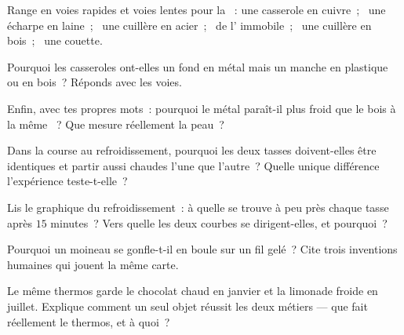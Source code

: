 \begin{exercise}[$\star$]\label{exo:g5:heat-and-insulation:3}
Range en voies rapides et voies lentes pour la ~: une
casserole en cuivre~; \ une écharpe en laine~; \ une cuillère en
acier~; \ de l' immobile~; \ une cuillère en bois~; \ une couette.
\end{exercise}

\begin{exercise}[$\star$]\label{exo:g5:heat-and-insulation:4}
Pourquoi les casseroles ont-elles un fond en métal mais un manche en
plastique ou en bois~? Réponds avec les voies.
\end{exercise}

\begin{exercise}[$\star$]\label{exo:g5:heat-and-insulation:5}
Enfin, avec tes propres mots~: pourquoi le métal paraît-il plus froid
que le bois à la même ~? Que mesure réellement la peau~?
\end{exercise}

\begin{exercise}[$\star$]\label{exo:g5:heat-and-insulation:6}
Dans la course au refroidissement, pourquoi les deux tasses
doivent-elles être identiques et partir aussi chaudes l'une que
l'autre~? Quelle unique différence l'expérience teste-t-elle~?
\end{exercise}

\begin{exercise}[$\star$]\label{exo:g5:heat-and-insulation:7}
Lis le graphique du refroidissement~: à quelle  se trouve
à peu près chaque tasse après $15$ minutes~? Vers quelle 
les deux courbes se dirigent-elles, et pourquoi~?
\end{exercise}

\begin{exercise}[$\star$]\label{exo:g5:heat-and-insulation:8}
Pourquoi un moineau se gonfle-t-il en boule sur un fil gelé~? Cite
trois inventions humaines qui jouent la même carte.
\end{exercise}

\begin{exercise}[$\star\star$]\label{exo:g5:heat-and-insulation:9}
Le même thermos garde le chocolat chaud en janvier et la limonade
froide en juillet. Explique comment un seul objet réussit les deux
métiers --- que fait réellement le thermos, et à quoi~?
\end{exercise}

